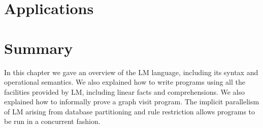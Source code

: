 \section{Applications}


\section{Summary}

In this chapter we gave an overview of the LM language, including its syntax and
operational semantics.  We also explained how to write programs using all the
facilities provided by LM, including linear facts and comprehensions. We also
explained how to informally prove a graph visit program.  The implicit
parallelism of LM arising from database partitioning and rule restriction allows
programs to be run in a concurrent fashion.
